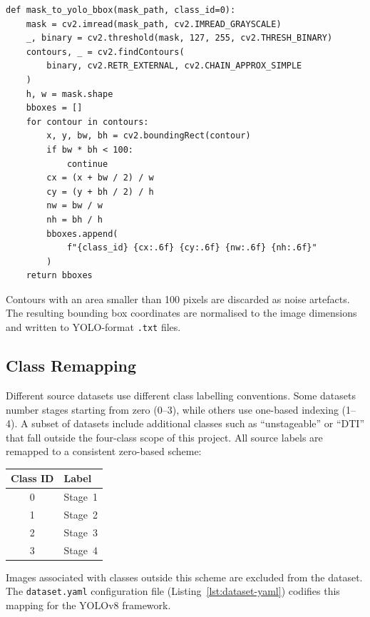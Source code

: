 \documentclass[a4paper,12pt,twoside]{report}
\begin{document}
\begin{lstlisting}[caption={Conversion of segmentation masks to YOLO bounding
  box format.}, label={lst:mask-convert}]
def mask_to_yolo_bbox(mask_path, class_id=0):
    mask = cv2.imread(mask_path, cv2.IMREAD_GRAYSCALE)
    _, binary = cv2.threshold(mask, 127, 255, cv2.THRESH_BINARY)
    contours, _ = cv2.findContours(
        binary, cv2.RETR_EXTERNAL, cv2.CHAIN_APPROX_SIMPLE
    )
    h, w = mask.shape
    bboxes = []
    for contour in contours:
        x, y, bw, bh = cv2.boundingRect(contour)
        if bw * bh < 100:
            continue
        cx = (x + bw / 2) / w
        cy = (y + bh / 2) / h
        nw = bw / w
        nh = bh / h
        bboxes.append(
            f"{class_id} {cx:.6f} {cy:.6f} {nw:.6f} {nh:.6f}"
        )
    return bboxes
\end{lstlisting}

Contours with an area smaller than 100 pixels are discarded as noise artefacts.
The resulting bounding box coordinates are normalised to the image dimensions and
written to YOLO-format \texttt{.txt} files.

\subsection{Class Remapping}

Different source datasets use different class labelling conventions. Some datasets
number stages starting from zero (0--3), while others use one-based indexing
(1--4). A subset of datasets include additional classes such as ``unstageable''
or ``DTI'' that fall outside the four-class scope of this project. All source
labels are remapped to a consistent zero-based scheme:

\begin{center}
  \begin{tabular}{cl}
    \toprule
    \textbf{Class ID} & \textbf{Label} \\
    \midrule
    0 & Stage~1 \\
    1 & Stage~2 \\
    2 & Stage~3 \\
    3 & Stage~4 \\
    \bottomrule
  \end{tabular}
\end{center}

Images associated with classes outside this scheme are excluded from the dataset.
The \texttt{dataset.yaml} configuration file (Listing~\ref{lst:dataset-yaml})
codifies this mapping for the YOLOv8 framework.
\end{document}
